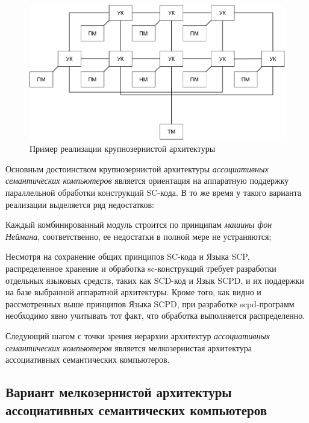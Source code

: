 \begin{figure}[H]
	\includegraphics[scale=0.7]{images/part6/chapter_computer/coarse-grained architecture.pdf}
	\caption{Пример реализации крупнозернистой архитектуры}
	\label{fig:coarse-grained-architecture}
\end{figure}

Основным достоинством крупнозернистой архитектуры \textit{ассоциативных семантических компьютеров} является ориентация на аппаратную поддержку параллельной обработки конструкций SC-кода. В то же время у такого варианта реализации выделяется ряд недостатков:
\begin{textitemize}
	\item Каждый комбинированный модуль строится по принципам \textit{машины фон Неймана}, соответственно, ее недостатки в полной мере не устраняются;
	\item Несмотря на сохранение общих принципов SC-кода и Языка SCP, распределенное хранение и обработка sc-конструкций требует разработки отдельных языковых средств, таких как SCD-код и Язык SCPD, и их поддержки на базе выбранной аппаратной архитектуры. Кроме того, как видно и рассмотренных выше принципов Языка SCPD, при разработке scpd-программ необходимо явно учитывать тот факт, что обработка выполняется распределенно.
\end{textitemize}	

Следующий шагом с точки зрения иерархии архитектур \textit{ассоциативных семантических компьютеров} является мелкозернистая архитектура ассоциативных семантических компьютеров.

\subsection{Вариант мелкозернистой архитектуры ассоциативных семантических компьютеров}

